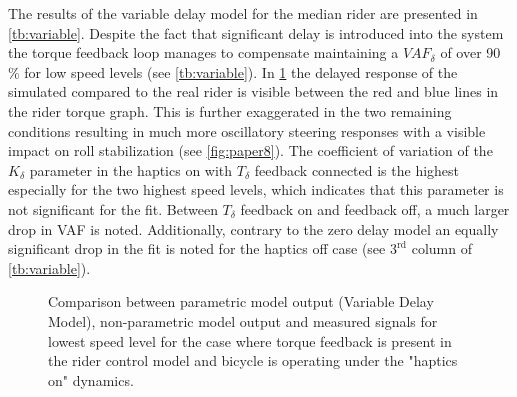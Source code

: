 The results of the variable delay model for the median rider are presented in \cref{tb:variable}.  Despite the fact that significant delay is introduced into the system the torque feedback loop manages to compensate maintaining a \ensuremath{\mathit{VAF}_\delta} of over 90 \% for low speed levels (see \cref{tb:variable}). In \cref{fig:dm_raw} the delayed response of the simulated compared to the real rider is visible between the red and blue lines in the rider torque graph. This is further exaggerated in the two remaining conditions resulting in much more oscillatory steering responses with a visible impact on roll stabilization (see \cref{fig:paper8}). The coefficient of variation of the \ensuremath{K_\delta} parameter in the haptics on with \ensuremath{T_\delta} feedback connected is the highest especially for the two highest speed levels, which indicates that this parameter is not significant for the fit. Between \ensuremath{{T_\delta}} feedback on and feedback off, a much larger drop in VAF is noted. Additionally, contrary to the zero delay model an equally significant drop in the fit is noted for the haptics off case (see \ensuremath{3^{\text{rd}}} column of \cref{tb:variable}). 






\begin{figure}[!h]
    \centering
        \centering
        \caption{Comparison between parametric model output (Variable Delay Model), non-parametric model output and measured signals for lowest speed level for the case where torque feedback is present in the rider control model and bicycle is operating under the "haptics on" dynamics.}   
        \label{fig:dm_raw}
\end{figure}



